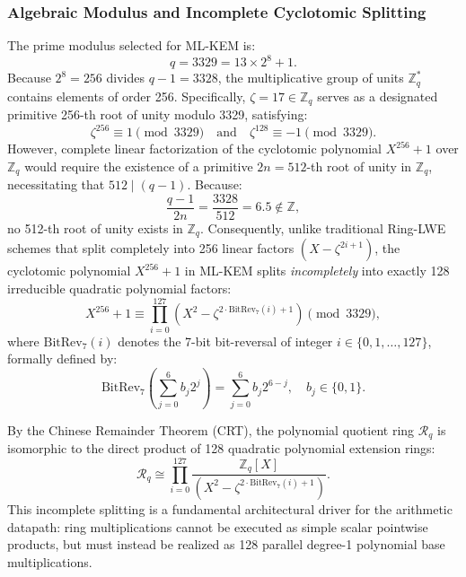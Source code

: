 \subsubsection{Algebraic Modulus and Incomplete Cyclotomic Splitting}
The prime modulus selected for \mbox{ML-KEM} is:
\begin{equation}
\label{eq:kyber_prime}
q = 3329 = 13 \times 2^8 + 1.
\end{equation}
Because $2^8 = 256$ divides $q - 1 = 3328$, the multiplicative group of units $\mathbb{Z}_q^*$ contains elements of order 256. Specifically, $\zeta = 17 \in \mathbb{Z}_q$ serves as a designated primitive 256-th root of unity modulo 3329, satisfying:
\begin{equation}
\label{eq:zeta_properties}
\zeta^{256} \equiv 1 \pmod{3329} \quad \text{and} \quad \zeta^{128} \equiv -1 \pmod{3329}.
\end{equation}
However, complete linear factorization of the cyclotomic polynomial $X^{256} + 1$ over $\mathbb{Z}_q$ would require the existence of a primitive $2n = 512$-th root of unity in $\mathbb{Z}_q$, necessitating that $512 \mid (q - 1)$. Because:
\begin{equation}
\label{eq:non_splitting_criterion}
\frac{q - 1}{2n} = \frac{3328}{512} = 6.5 \notin \mathbb{Z},
\end{equation}
no 512-th root of unity exists in $\mathbb{Z}_q$. Consequently, unlike traditional Ring-LWE schemes that split completely into 256 linear factors $(X - \zeta^{2i+1})$, the cyclotomic polynomial $X^{256} + 1$ in \mbox{ML-KEM} splits \textit{incompletely} into exactly 128 irreducible quadratic polynomial factors:
\begin{equation}
\label{eq:poly_splitting}
X^{256} + 1 \equiv \prod_{i=0}^{127} \left( X^2 - \zeta^{2 \cdot \text{BitRev}_7(i) + 1} \right) \pmod{3329},
\end{equation}
where $\text{BitRev}_7(i)$ denotes the 7-bit bit-reversal of integer $i \in \{0, 1, \dots, 127\}$, formally defined by:
\begin{equation}
\label{eq:bitrev7_def}
\text{BitRev}_7\left( \sum_{j=0}^{6} b_j 2^j \right) = \sum_{j=0}^{6} b_j 2^{6-j}, \quad b_j \in \{0, 1\}.
\end{equation}

By the Chinese Remainder Theorem (CRT), the polynomial quotient ring $\mathcal{R}_q$ is isomorphic to the direct product of 128 quadratic polynomial extension rings:
\begin{equation}
\label{eq:crt_isomorphism}
\mathcal{R}_q \cong \prod_{i=0}^{127} \frac{\mathbb{Z}_q[X]}{\left( X^2 - \zeta^{2 \cdot \text{BitRev}_7(i) + 1} \right)}.
\end{equation}
This incomplete splitting is a fundamental architectural driver for the arithmetic datapath: ring multiplications cannot be executed as simple scalar pointwise products, but must instead be realized as 128 parallel degree-1 polynomial base multiplications.

